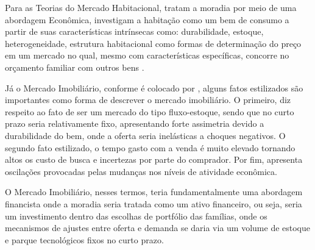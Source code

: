 

Para as Teorias do Mercado Habitacional, tratam a moradia por meio de uma abordagem Econômica, investigam a habitação como um bem de consumo a partir de suas características intrínsecas como:  durabilidade, estoque, heterogeneidade, estrutura habitacional como formas de determinação do preço em um mercado no qual, mesmo com características específicas, concorre no orçamento familiar com outros bens \cite{Blank2014struture}.


Já o Mercado Imobiliário, conforme é colocado por , alguns fatos estilizados são importantes como forma de descrever o mercado imobiliário. O primeiro, diz respeito ao fato de ser um mercado do tipo fluxo-estoque, sendo que no curto prazo seria relativamente fixo, apresentando forte assimetria devido a durabilidade do bem, onde a oferta seria inelásticas a choques negativos. O segundo fato estilizado, o tempo gasto com a venda é muito elevado tornando altos os custo de busca e incertezas por parte do comprador. Por fim, apresenta oscilações provocadas pelas mudanças nos níveis de atividade econômica.


O Mercado Imobiliário, nesses termos, teria fundamentalmente uma abordagem financista onde a moradia seria tratada como um ativo financeiro, ou seja, seria um investimento dentro das escolhas de portfólio das famílias, onde os mecanismos de ajustes entre oferta e demanda se daria via um volume de estoque e parque tecnológicos fixos no curto prazo.


